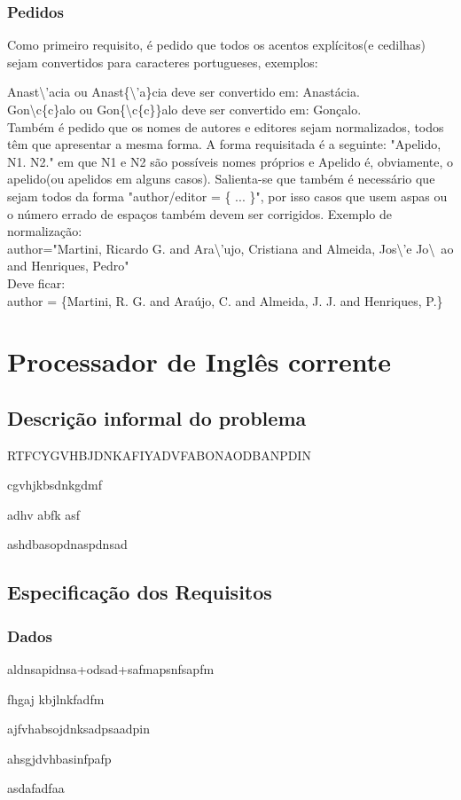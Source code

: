 \documentclass{report}
\begin{document}
\subsubsection{Pedidos}
Como primeiro requisito, é pedido que todos os acentos explícitos(e cedilhas) sejam convertidos para caracteres portugueses,
 exemplos:\par
Anast\textbackslash'acia ou Anast\{\textbackslash'a\}cia deve ser convertido em: Anastácia. \\
Gon\textbackslash c\{c\}alo ou Gon\{\textbackslash c\{c\}\}alo deve ser convertido em: Gonçalo. \\
Também é pedido que os nomes de autores e editores sejam normalizados, todos têm que apresentar a mesma forma.
A forma requisitada é a seguinte: "Apelido, N1. N2." em que N1 e N2 são possíveis nomes próprios e Apelido é,
obviamente, o apelido(ou apelidos em alguns casos). Salienta-se que também é necessário que sejam todos da forma
"author/editor = \{ ... \}", por isso casos que usem aspas ou o número errado de espaços também devem ser 
corrigidos. Exemplo de normalização: \\
author="Martini, Ricardo G. and Ara{\textbackslash’u}jo, Cristiana and Almeida, 
Jos{\textbackslash’e} Jo{\textbackslash~a}o and Henriques, Pedro" \\
Deve ficar: \\
author = \{Martini, R. G. and Araújo, C. and Almeida, J. J. and Henriques, P.\}


\section{Processador de Inglês corrente}

\subsection{Descrição informal do problema}
RTFCYGVHBJDNKAFIYADVFABONAODBANPDIN\par
cgvhjkbsdnkgdmf\par
adhv abfk asf\par
ashdbasopdnaspdnsad

\subsection{Especificação dos Requisitos}
\subsubsection{Dados}
aldnsapidnsa+odsad+safmapsnfsapfm\par
fhgaj kbjlnkfadfm\par
ajfvhabsojdnksadpsaadpin\par
ahsgjdvhbasinfpafp\par
asdafadfaa
\end{document}
